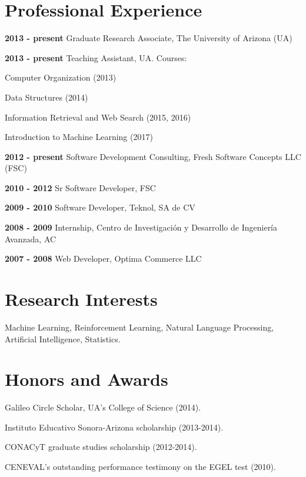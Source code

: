 \documentclass[letterpaper]{article}
\renewenvironment{itemize}{
  \begin{list}{}{
    \setlength{\leftmargin}{1.5em}
  }
}{
  \end{list}
}
\begin{document}
\section*{Professional Experience}

\begin{itemize}
\item \textbf{2013 - present} Graduate Research Associate, The University of Arizona (UA)
\item \textbf{2013 - present} Teaching Assistant, UA. Courses:
\item \begin{itemize}
	\item Computer Organization (2013)
	\item Data Structures (2014)
	\item Information Retrieval and Web Search (2015, 2016)
	\item Introduction to Machine Learning (2017)
\end{itemize}
\item \textbf{2012 - present} Software Development Consulting, Fresh Software Concepts LLC (FSC)
\item \textbf{2010 - 2012} Sr Software Developer, FSC
\item \textbf{2009 - 2010} Software Developer, Teknol, SA de CV
\item \textbf{2008 - 2009} Internship, {\small Centro de Investigaci\'{o}n y Desarrollo de Ingenier\'{i}a Avanzada, AC}
\item \textbf{2007 - 2008} Web Developer, Optima Commerce LLC
\end{itemize}

\section*{Research Interests}
Machine Learning, Reinforcement Learning, Natural Language Processing, Artificial Intelligence, Statistics.

\section*{Honors and Awards}
\begin{itemize}
	\item Galileo Circle Scholar, UA's College of Science (2014).
	\item Instituto Educativo Sonora-Arizona scholarship (2013-2014).
	\item CONACyT graduate studies scholarship (2012-2014).
	\item CENEVAL's outstanding performance testimony on the EGEL test (2010). 
\end{itemize}
\end{document}
